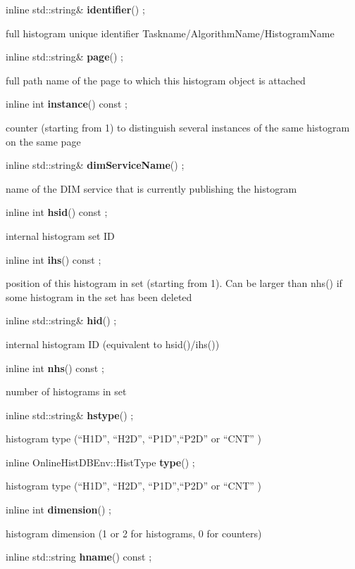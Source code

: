 \item    inline std::string\& {\bf identifier}() ;

 full histogram unique identifier Taskname/AlgorithmName/HistogramName


\item    inline std::string\& {\bf page}() ;

 full path name of the page to which this histogram object is attached


\item    inline int {\bf instance}() const ;

 counter (starting from 1) to distinguish several instances of the same histogram on the same page


\item    inline std::string\& {\bf dimServiceName}() ;

 name of the DIM service that is currently publishing the histogram


\item    inline int {\bf hsid}() const ;

 internal histogram set ID


\item    inline int {\bf ihs}() const ;

 position of this histogram in set (starting from 1). Can be larger than nhs() if some histogram in the set has been deleted


\item    inline std::string\& {\bf hid}() ;

 internal histogram ID (equivalent to hsid()/ihs())


\item    inline int {\bf nhs}() const ;

 number of histograms in set


\item    inline std::string\& {\bf hstype}() ;

 histogram type (``H1D'', ``H2D'', ``P1D'',``P2D'' or ``CNT'' )


\item    inline OnlineHistDBEnv::HistType {\bf type}() ;

 histogram type (``H1D'', ``H2D'', ``P1D'',``P2D'' or ``CNT'' )


\item    inline int {\bf dimension}() ;

 histogram dimension (1 or 2 for histograms, 0 for counters)


\item    inline std::string {\bf hname}() const ;

